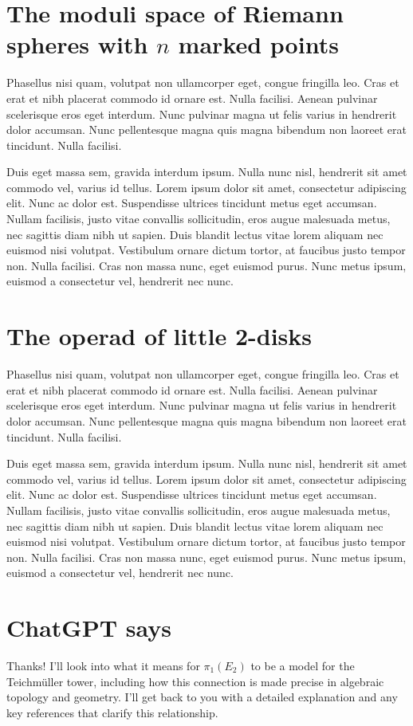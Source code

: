 \section{The moduli space of Riemann spheres with \(n\) marked points}

Phasellus nisi quam, volutpat non ullamcorper eget, congue fringilla leo. Cras et erat et nibh placerat commodo id ornare est. Nulla facilisi. Aenean pulvinar scelerisque eros eget interdum. Nunc pulvinar magna ut felis varius in hendrerit dolor accumsan. Nunc pellentesque magna quis magna bibendum non laoreet erat tincidunt. Nulla facilisi.

Duis eget massa sem, gravida interdum ipsum. Nulla nunc nisl, hendrerit sit amet commodo vel, varius id tellus. Lorem ipsum dolor sit amet, consectetur adipiscing elit. Nunc ac dolor est. Suspendisse ultrices tincidunt metus eget accumsan. Nullam facilisis, justo vitae convallis sollicitudin, eros augue malesuada metus, nec sagittis diam nibh ut sapien. Duis blandit lectus vitae lorem aliquam nec euismod nisi volutpat. Vestibulum ornare dictum tortor, at faucibus justo tempor non. Nulla facilisi. Cras non massa nunc, eget euismod purus. Nunc metus ipsum, euismod a consectetur vel, hendrerit nec nunc.

\section{The operad of little 2-disks}

Phasellus nisi quam, volutpat non ullamcorper eget, congue fringilla leo. Cras et erat et nibh placerat commodo id ornare est. Nulla facilisi. Aenean pulvinar scelerisque eros eget interdum. Nunc pulvinar magna ut felis varius in hendrerit dolor accumsan. Nunc pellentesque magna quis magna bibendum non laoreet erat tincidunt. Nulla facilisi.

Duis eget massa sem, gravida interdum ipsum. Nulla nunc nisl, hendrerit sit amet commodo vel, varius id tellus. Lorem ipsum dolor sit amet, consectetur adipiscing elit. Nunc ac dolor est. Suspendisse ultrices tincidunt metus eget accumsan. Nullam facilisis, justo vitae convallis sollicitudin, eros augue malesuada metus, nec sagittis diam nibh ut sapien. Duis blandit lectus vitae lorem aliquam nec euismod nisi volutpat. Vestibulum ornare dictum tortor, at faucibus justo tempor non. Nulla facilisi. Cras non massa nunc, eget euismod purus. Nunc metus ipsum, euismod a consectetur vel, hendrerit nec nunc.

\section{ChatGPT says}
Thanks! I'll look into what it means for $\pi_1(E_2)$ to be a model for the Teichm\"uller tower, including how this connection is made precise in algebraic topology and geometry.
I'll get back to you with a detailed explanation and any key references that clarify this relationship.


